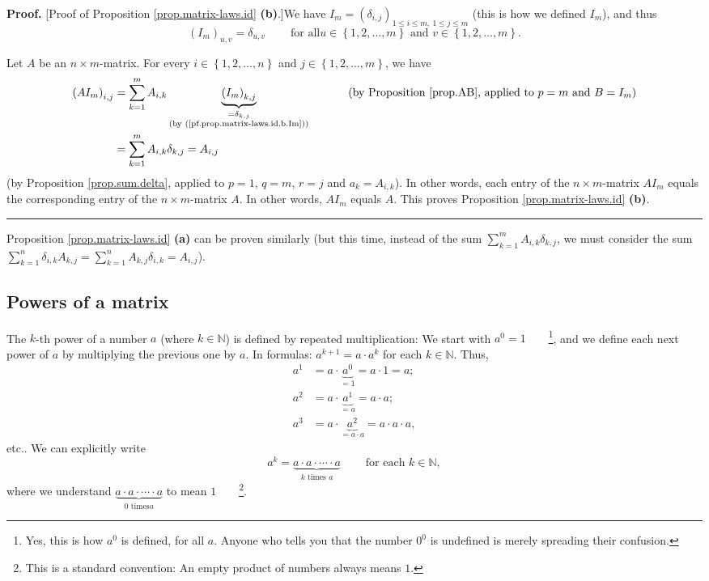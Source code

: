 \documentclass[numbers=enddot,12pt,final,onecolumn,notitlepage]{scrartcl}%
\theoremstyle{definition}
\newenvironment{proof}[1][Proof]{\noindent\textbf{#1.} }{\ \rule{0.5em}{0.5em}}
\let\sumnonlimits\sum
\renewcommand{\sum}{\sumnonlimits\limits}
\begin{document}
\begin{proof}
[Proof of Proposition \ref{prop.matrix-laws.id} \textbf{(b)}.]We have
$I_{m}=\left(  \delta_{i,j}\right)  _{1\leq i\leq m,\ 1\leq j\leq m}$ (this is
how we defined $I_{m}$), and thus%
\begin{equation}
\left(  I_{m}\right)  _{u,v}=\delta_{u,v}\ \ \ \ \ \ \ \ \ \ \text{for all
}u\in\left\{  1,2,\ldots,m\right\}  \text{ and }v\in\left\{  1,2,\ldots
,m\right\}  . \label{pf.prop.matrix-laws.id.b.Im}%
\end{equation}


Let $A$ be an $n\times m$-matrix. For every $i\in\left\{  1,2,\ldots
,n\right\}  $ and $j\in\left\{  1,2,\ldots,m\right\}  $, we have%
\begin{align*}
\left(  AI_{m}\right)  _{i,j}  &  =\sum_{k=1}^{m}A_{i,k}\underbrace{\left(
I_{m}\right)  _{k,j}}_{\substack{=\delta_{k,j}\\\text{(by
(\ref{pf.prop.matrix-laws.id.b.Im}))}}}\ \ \ \ \ \ \ \ \ \ \left(  \text{by
Proposition \ref{prop.AB}, applied to }p=m\text{ and }B=I_{m}\right) \\
&  =\sum_{k=1}^{m}A_{i,k}\delta_{k,j}=A_{i,j}%
\end{align*}
(by Proposition \ref{prop.sum.delta}, applied to $p=1$, $q=m$, $r=j$ and
$a_{k}=A_{i,k}$). In other words, each entry of the $n\times m$-matrix
$AI_{m}$ equals the corresponding entry of the $n\times m$-matrix $A$. In
other words, $AI_{m}$ equals $A$. This proves Proposition
\ref{prop.matrix-laws.id} \textbf{(b)}.
\end{proof}

Proposition \ref{prop.matrix-laws.id} \textbf{(a)} can be proven similarly
(but this time, instead of the sum $\sum_{k=1}^{m}A_{i,k}\delta_{k,j}$, we
must consider the sum $\sum_{k=1}^{n}\delta_{i,k}A_{k,j}=\sum_{k=1}^{n}%
A_{k,j}\delta_{i,k}=A_{i,j}$).

\subsection{Powers of a matrix}

The $k$-th power of a number $a$ (where $k\in\mathbb{N}$) is defined by
repeated multiplication: We start with $a^{0}=1$\ \ \ \ \footnote{Yes, this is
how $a^{0}$ is defined, for all $a$. Anyone who tells you that the number
$0^{0}$ is undefined is merely spreading their confusion.}, and we define each
next power of $a$ by multiplying the previous one by $a$. In formulas:
$a^{k+1}=a\cdot a^{k}$ for each $k\in\mathbb{N}$. Thus,%
\begin{align*}
a^{1}  &  =a\cdot\underbrace{a^{0}}_{=1}=a\cdot1=a;\\
a^{2}  &  =a\cdot\underbrace{a^{1}}_{=a}=a\cdot a;\\
a^{3}  &  =a\cdot\underbrace{a^{2}}_{=a\cdot a}=a\cdot a\cdot a,
\end{align*}
etc.. We can explicitly write
\[
a^{k}=\underbrace{a\cdot a\cdot\cdots\cdot a}_{k\text{ times }a}%
\ \ \ \ \ \ \ \ \ \ \text{for each }k\in\mathbb{N},
\]
where we understand $\underbrace{a\cdot a\cdot\cdots\cdot a}_{0\text{ times
}a}$ to mean $1$\ \ \ \ \footnote{This is a standard convention: An empty
product of numbers always means $1$.}.
\end{document}
